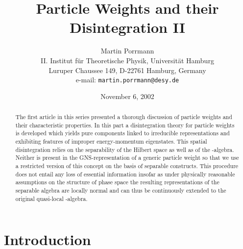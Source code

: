 \documentclass[a4paper,a4paper]{article}
\numberwithin{equation}{section}
\theoremstyle{definition}
\theoremstyle{plain}
\theoremstyle{remark}
\theoremstyle{assumption}
\begin{document}
%
\title{Particle Weights and their Disintegration II}
\author{Martin Porrmann\\
  II. Institut f\"ur Theoretische Physik, Universit\"at Hamburg\\
  Luruper Chaussee 149, D-22761 Hamburg, Germany\\
  e-mail: \texttt{martin.porrmann@desy.de}}
\date{November 6, 2002}

\maketitle

%
\begin{abstract}
  The first article in this series presented a thorough discussion of
  particle weights and their characteristic properties. In this part a
  disintegration theory for particle weights is developed which yields
  pure components linked to irreducible representations and exhibiting
  features of improper energy-momentum eigenstates. This spatial
  disintegration relies on the separability of the Hilbert space as
  well as of the \coordHE{}-algebra. Neither is present in the
  GNS-representation of a generic particle weight so that we use a
  restricted version of this concept on the basis of separable
  constructs. This procedure does not entail any loss of essential
  information insofar as under physically reasonable assumptions on
  the structure of phase space the resulting representations of the
  separable algebra are locally normal and can thus be continuously
  extended to the original quasi-local \coordHE{}-algebra.
\end{abstract}



\section{Introduction}
  \label{sec:introduction}
  
\end{document}
